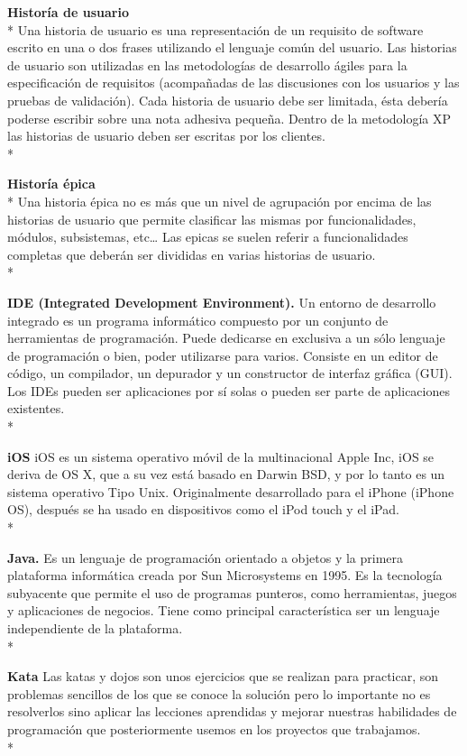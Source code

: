 \documentclass[../pfc.tex]{subfiles}
\begin{document}
	\textbf{Historía de usuario}\\*
	Una historia de usuario es una representación de un requisito de software escrito en una o dos frases utilizando el lenguaje común del usuario. Las historias de usuario son utilizadas en las metodologías de desarrollo ágiles para la especificación de requisitos (acompañadas de las discusiones con los usuarios y las pruebas de validación). Cada historia de usuario debe ser limitada, ésta debería poderse escribir sobre una nota adhesiva pequeña. Dentro de la metodología XP las historias de usuario deben ser escritas por los clientes.\\*
	
	\textbf{Historía épica}\\*
	Una historia épica no es más que un nivel de agrupación por encima de las historias de usuario que permite clasificar las mismas por funcionalidades, módulos, subsistemas, etc… 
	Las epicas se suelen referir a funcionalidades completas que deberán ser divididas en varias historias de usuario.\\*
	
	\textbf{IDE (Integrated Development Environment).}
	Un entorno de desarrollo integrado es un programa
	informático compuesto por un conjunto de herramientas de programación. Puede dedicarse en
	exclusiva a un sólo lenguaje de programación o bien, poder utilizarse para varios. Consiste en un
	editor de código, un compilador, un depurador y un constructor de interfaz gráfica (GUI). Los IDEs
	pueden ser aplicaciones por sí solas o pueden ser parte de aplicaciones existentes.\\*
	
	\textbf{iOS}
	iOS es un sistema operativo móvil de la multinacional Apple Inc, iOS se deriva de OS X, que a su vez está basado en Darwin BSD, y por lo tanto es un sistema operativo Tipo Unix. Originalmente desarrollado para el iPhone (iPhone OS), después se ha usado en dispositivos como el iPod touch y el iPad. \\*
	
	\textbf{Java.}
	Es un lenguaje de programación orientado a objetos y la primera plataforma informática
	creada por Sun Microsystems en 1995. Es la tecnología subyacente que permite el uso de
	programas punteros, como herramientas, juegos y aplicaciones de negocios. Tiene como principal
	característica ser un lenguaje independiente de la plataforma.\\*
	
	\textbf{Kata}
	Las katas y dojos son unos ejercicios que se realizan para practicar, son problemas sencillos de los que se conoce la solución pero lo importante no es resolverlos sino aplicar las lecciones aprendidas y mejorar nuestras habilidades de programación que posteriormente usemos en los proyectos que trabajamos.\\*
	
\end{document}
